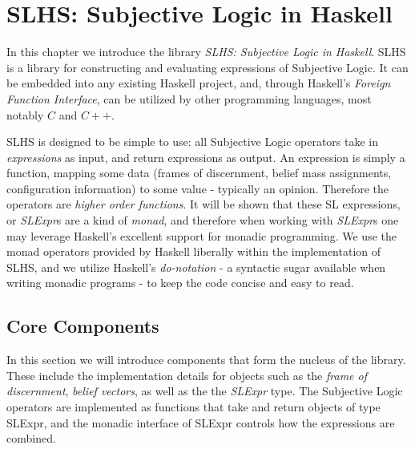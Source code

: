 \documentclass[thesis.tex]{subfiles}
\begin{document}
\chapter{SLHS: Subjective Logic in Haskell}
\label{chap:sl-in-haskell}



In this chapter we introduce the library \emph{SLHS:
  Subjective Logic in Haskell}. SLHS is a library
for constructing and evaluating expressions of Subjective Logic. It
can be embedded into any existing Haskell project, and, through
Haskell's \emph{Foreign Function Interface}, can be utilized by other
programming languages, most notably $C$ and $C++$.

SLHS is designed to be simple to use: all Subjective Logic operators
take in \emph{expressions} as input, and return expressions as output.
An expression is simply a function, mapping some data (frames of
discernment, belief mass assignments, configuration information) to
some value - typically an opinion. Therefore the operators are \emph{higher order functions}.
It will be shown that these SL expressions, or \emph{SLExpr}s are a
kind of \emph{monad}, and therefore when working with \emph{SLExpr}s one may leverage
Haskell's excellent support for monadic programming. We use the monad operators provided by Haskell liberally
within the implementation of SLHS, and we utilize Haskell's \emph{do-notation} - a syntactic sugar available
when writing monadic programs - to keep the code concise and easy to read.


\section{Core Components}

In this section we will introduce components that form the nucleus of the library. These include the implementation details
for objects such as the \emph{frame of discernment}, \emph{belief vectors}, as well as the the \emph{SLExpr} type.
The Subjective Logic operators are implemented as functions that take and return objects of type SLExpr, and the
monadic interface of SLExpr controls how the expressions are combined.








\end{document}
